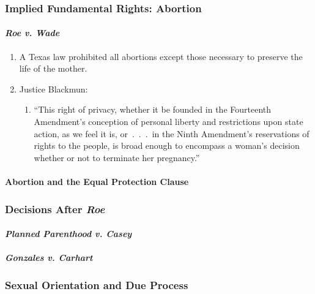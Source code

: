 \subsubsection{Implied Fundamental Rights: Abortion}
 
\paragraph{\emph{Roe v. Wade}}
 
\begin{enumerate}
    \item A Texas law prohibited all abortions except those necessary to 
    preserve the life of the mother.
    \item Justice Blackmun:
    \begin{enumerate}
        \item ``This right of privacy, whether it be founded in the Fourteenth 
        Amendment's conception of personal liberty and restrictions upon state 
        action, as we feel it is, or~.~.~.~in the Ninth Amendment's 
        reservations of rights to the people, is broad enough to encompass a 
        woman's decision whether or not to terminate her pregnancy.''
    \end{enumerate}
\end{enumerate}
 
\paragraph{Abortion and the Equal Protection Clause}
 
\subsubsection{Decisions After \emph{Roe}}
 
\paragraph{\emph{Planned Parenthood v. Casey}}
 
\paragraph{\emph{Gonzales v. Carhart}}
 
\subsubsection{Sexual Orientation and Due Process}
 
